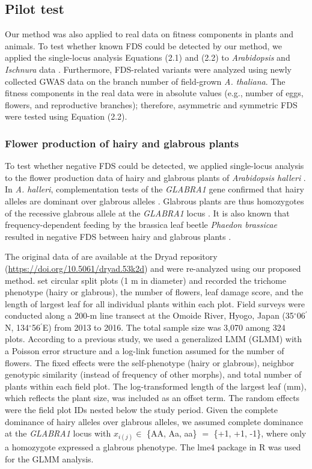 \documentclass[12pt,]{article}
\begin{document}
\subsection{Pilot test}
Our method was also applied to real data on fitness components in plants and animals. To test whether known FDS could be detected by our method, we applied the single-locus analysis Equations (2.1) and (2.2) to \textit{Arabidopsis} and \textit{Ischnura} data \citep{sato2017herbivore, takahashi2014evolution}. Furthermore, FDS-related variants were analyzed using newly collected GWAS data on the branch number of field-grown \textit{A. thaliana}. The fitness components in the real data were in absolute values (e.g., number of eggs, flowers, and reproductive branches); therefore, asymmetric and symmetric FDS were tested using Equation (2.2).

\subsubsection{Flower production of hairy and glabrous plants}
To test whether negative FDS could be detected, we applied single-locus analysis to the flower production data of hairy and glabrous plants of \textit{Arabidopsis halleri} \citep{sato2017herbivore}. In \textit{A. halleri}, complementation tests of the \textit{GLABRA1} gene confirmed that hairy alleles are dominant over glabrous alleles \citep{shimizu2002ecology}. Glabrous plants are thus homozygotes of the recessive glabrous allele at the \textit{GLABRA1} locus \citep{kawagoe2011coexistence}. It is also known that frequency-dependent feeding by the brassica leaf beetle \textit{Phaedon brassicae} resulted in negative FDS between hairy and glabrous plants \citep{sato2017herbivore}. 

The original data of \cite{sato2017herbivore} are available at the Dryad repository (\url{https://doi.org/10.5061/dryad.53k2d}) and were re-analyzed using our proposed method. \cite{sato2017herbivore} set circular split plots (1 m in diameter) and recorded the trichome phenotype (hairy or glabrous), the number of flowers, leaf damage score, and the length of largest leaf for all individual plants within each plot. Field surveys were conducted along a 200-m line transect at the Omoide River, Hyogo, Japan (35$^\circ$06$^\prime$N, 134$^\circ$56$^\prime$E) from 2013 to 2016. The total sample size was 3,070 among 324 plots. According to a previous study, we used a generalized LMM (GLMM) with a Poisson error structure and a log-link function assumed for the number of flowers. The fixed effects were the self-phenotype (hairy or glabrous), neighbor genotypic similarity (instead of frequency of other morphs), and total number of plants within each field plot. The log-transformed length of the largest leaf (mm), which reflects the plant size, was included as an offset term. The random effects were the field plot IDs nested below the study period. Given the complete dominance of hairy alleles over glabrous alleles, we assumed complete dominance at the \textit{GLABRA1} locus with $x_{i(j)} \in$ \{AA, Aa, aa\} $=$ \{+1, +1, -1\}, where only a homozygote expressed a glabrous phenotype. The lme4 package \citep{bates2015} in R was used for the GLMM analysis.
\end{document}
